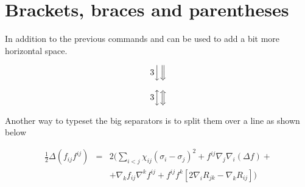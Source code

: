 {{{%
%



\section{Brackets, braces and parentheses}

In addition  to the previous commands  and  can be used to add a bit more horizontal space.

\[3\Big\downarrow 
\Big\Downarrow\]


\[3\Big\updownarrow
\Big\Updownarrow\]

Another way to typeset the big separators is to split them over a line as shown below

{\arraycolsep=2pt
 \begin{equation}
 \begin{array}{rcl}
 \frac{1}{2}\Delta(f_{ij}f^{ij}) & = & 2\Bigg({\displaystyle
 \sum_{i<j}}\chi_{ij}(\sigma_{i}-\sigma_{j})^{2}+f^{ij}%
 \nabla_{j}\nabla_{i}(\Delta f)+\\
 & & +\nabla_{k}f_{ij}\nabla^{k}f^{ij}+f^{ij}f^{k}[2
 \nabla_{i}R_{jk}-\nabla_{k}R_{ij}]\Bigg)
 \end{array}
 \end{equation}

}}}}
